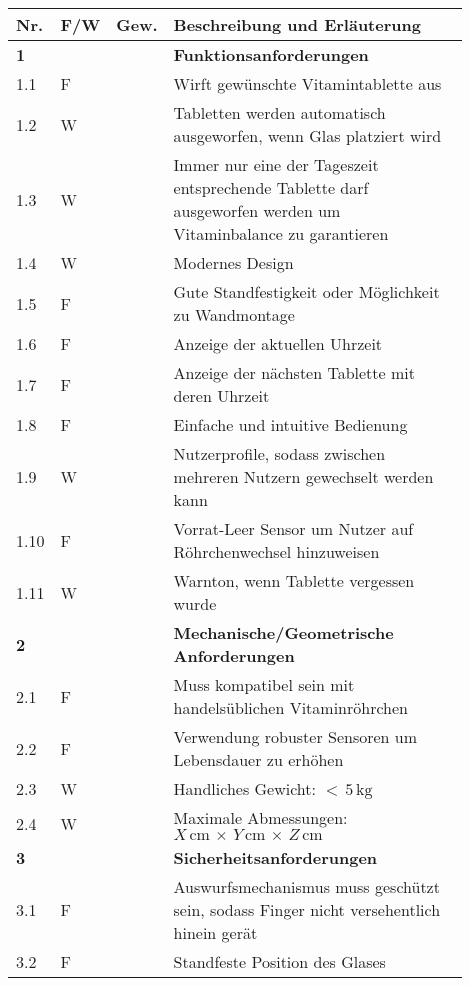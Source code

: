 \begin{longtable}{C{0.05\linewidth}C{0.05\linewidth}C{0.05\linewidth}L{0.75\linewidth}}
	\toprule
 	
 	\textbf{Nr.} & \textbf{F/W} & \textbf{Gew.} & \textbf{Beschreibung und Erläuterung}  \\
	
	\toprule
	\endfirsthead
	
	\textbf{1} & & & \textbf{Funktionsanforderungen}  \\
	1.1 & F & & Wirft gewünschte Vitamintablette aus  \\
	1.2 & W & & Tabletten werden automatisch ausgeworfen, wenn Glas platziert wird \\
	1.3 & W & & Immer nur eine der Tageszeit entsprechende Tablette darf ausgeworfen werden um Vitaminbalance zu garantieren \\
	1.4 & W & & Modernes Design \\
	1.5 & F & & Gute Standfestigkeit oder Möglichkeit zu Wandmontage \\
	1.6 & F & & Anzeige der aktuellen Uhrzeit \\
	1.7 & F & & Anzeige der nächsten Tablette mit deren Uhrzeit \\
	1.8 & F & & Einfache und intuitive Bedienung \\
	1.9 & W & & Nutzerprofile, sodass zwischen mehreren Nutzern gewechselt werden kann \\
	1.10 & F & & Vorrat-Leer Sensor um Nutzer auf Röhrchenwechsel hinzuweisen \\
	1.11 & W & & Warnton, wenn Tablette vergessen wurde \\
	
	\midrule
	
	\textbf{2} & & & \textbf{Mechanische/Geometrische Anforderungen} \\
	2.1 & F & & Muss kompatibel sein mit handelsüblichen Vitaminröhrchen \\
	2.2 & F & & Verwendung robuster Sensoren um Lebensdauer zu erhöhen \\
	2.3 & W & & Handliches Gewicht: $<\,5\,\text{kg}$ \\
	2.4 & W & & Maximale Abmessungen: $X\,\text{cm}\,\times\,Y\,\text{cm}\,\times\,Z\,\text{cm}$ \\
	
	\midrule
	
	\textbf{3} & & & \textbf{Sicherheitsanforderungen} \\
	3.1 & F & & Auswurfsmechanismus muss geschützt sein, sodass Finger nicht versehentlich hinein gerät \\
	3.2 & F & & Standfeste Position des Glases \\
	

\end{longtable}
